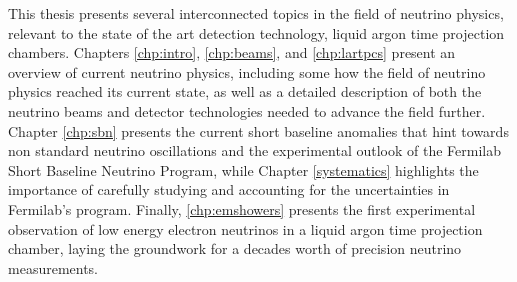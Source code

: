 

This thesis presents several interconnected topics in the field of neutrino physics, relevant to the state of the art detection technology, liquid argon time projection chambers.  Chapters \ref{chp:intro}, \ref{chp:beams}, and \ref{chp:lartpcs} present an overview of current neutrino physics, including some how the field of neutrino physics reached its current state, as well as a detailed description of both the neutrino beams and detector technologies needed to advance the field further.  Chapter \ref{chp:sbn} presents the current short baseline anomalies that hint towards non standard neutrino oscillations and the experimental outlook of the Fermilab Short Baseline Neutrino Program, while Chapter \ref{systematics} highlights the importance of carefully studying and accounting for the uncertainties in Fermilab's program.  Finally, \ref{chp:emshowers} presents the first experimental observation of low energy electron neutrinos in a liquid argon time projection chamber, laying the groundwork for a decades worth of precision neutrino measurements.